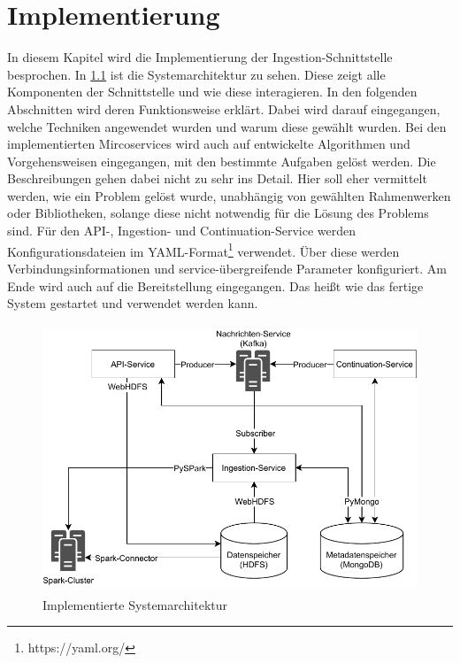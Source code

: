 \chapter{Implementierung}

In diesem Kapitel wird die Implementierung der Ingestion-Schnittstelle besprochen.
In \cref{fig:impl-arch} ist die Systemarchitektur zu sehen.
Diese zeigt alle Komponenten der Schnittstelle und wie diese interagieren.
In den folgenden Abschnitten wird deren Funktionsweise erklärt.
Dabei wird darauf eingegangen, welche Techniken angewendet wurden und warum diese gewählt wurden.
Bei den implementierten Mircoservices wird auch auf entwickelte Algorithmen und Vorgehensweisen eingegangen, mit den bestimmte Aufgaben gelöst werden.
Die Beschreibungen gehen dabei nicht zu sehr ins Detail.
Hier soll eher vermittelt werden, wie ein Problem gelöst wurde, unabhängig von gewählten Rahmenwerken oder Bibliotheken, solange diese nicht notwendig für die Lösung des Problems sind.
Für den API-, Ingestion- und Continuation-Service werden Konfigurationsdateien im YAML-Format\footnote{https://yaml.org/} verwendet.
Über diese werden Verbindungsinformationen und service-übergreifende Parameter konfiguriert.
Am Ende wird auch auf die Bereitstellung eingegangen.
Das heißt wie das fertige System gestartet und verwendet werden kann.


\begin{figure}
    \centering
    \includegraphics[height=8cm]{Grafiken/Umsetzung-System-Architektur.pdf}
    \caption{Implementierte Systemarchitektur}
    \label{fig:impl-arch}
\end{figure}









